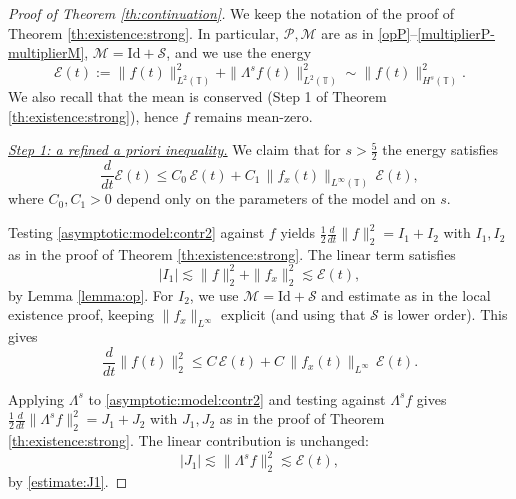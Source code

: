 \documentclass[reqno]{amsart}
\newcommand{\TT}{\mathbb T}
\newcommand{\Id}{\mathrm{Id}}
\theoremstyle{definition}
\numberwithin{equation}{section}
\numberwithin{theorem}{section}
\numberwithin{definition}{section}
\begin{document}
\begin{proof}[Proof of Theorem \ref{th:continuation}]
We keep the notation of the proof of Theorem \ref{th:existence:strong}. In particular,
$\mathcal{P},\mathcal{M}$ are as in \eqref{opP}--\eqref{multiplierP-multiplierM}, $\mathcal{M}=\Id+\mathcal{S}$,
and we use the energy
\[
\mathcal{E}(t):=\|f(t)\|_{L^2(\TT)}^{2}+\|\Lambda^s f(t)\|_{L^2(\TT)}^{2}\sim \|f(t)\|_{H^s(\TT)}^{2}.
\]
We also recall that the mean is conserved (Step 1 of Theorem \ref{th:existence:strong}), hence $f$ remains mean-zero.

\medskip\noindent
\underline{\textit{Step 1: a refined a priori inequality.}}
We claim that for $s>\frac52$ the energy satisfies
\begin{equation}\label{energy:tame}
	\frac{d}{dt}\mathcal{E}(t)\le C_0\,\mathcal{E}(t)+C_1\,\|f_x(t)\|_{L^\infty(\TT)}\,\mathcal{E}(t),
\end{equation}
where $C_0,C_1>0$ depend only on the parameters of the model and on $s$.

\smallskip
Testing \eqref{asymptotic:model:contr2} against $f$ yields
$\frac12\frac{d}{dt}\|f\|_2^2=I_1+I_2$ with $I_1,I_2$ as in the proof of Theorem \ref{th:existence:strong}.
The linear term satisfies
\begin{equation}\label{cont:I1}
	|I_1|\lesssim \|f\|_2^2+\|f_x\|_2^2\lesssim \mathcal{E}(t),
\end{equation}
by Lemma \ref{lemma:op}. For $I_2$, we use $\mathcal{M}=\Id+\mathcal{S}$ and estimate as in the local existence
proof, keeping $\|f_x\|_{L^\infty}$ explicit (and using that $\mathcal{S}$ is lower order). This gives
\begin{equation}\label{cont:L2}
	\frac{d}{dt}\|f(t)\|_{2}^{2}\le C\,\mathcal{E}(t)+C\,\|f_x(t)\|_{L^\infty}\,\mathcal{E}(t).
\end{equation}

\smallskip
Applying $\Lambda^s$ to \eqref{asymptotic:model:contr2} and testing against $\Lambda^s f$
gives $\frac12\frac{d}{dt}\|\Lambda^s f\|_2^2=J_1+J_2$ with $J_1,J_2$ as in the proof of
Theorem \ref{th:existence:strong}. The linear contribution is unchanged:
\begin{equation}\label{cont:J1}
	|J_1|\lesssim \|\Lambda^s f\|_2^2\lesssim \mathcal{E}(t),
\end{equation}
by \eqref{estimate:J1}.


\end{proof}
\end{document}
